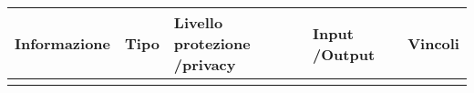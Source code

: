 \begin{center}

    \begin{tabularx}{\textwidth}
        {|X|>{\centering}X|X|X|X|}
        \hline  \rowcolor{tableGreen!70}
        \multicolumn{5}{|c|}{\Large\textbf{?}}
        \n      \rowcolor{tableGreen!50}
        \large \textbf{Informazione} & \large\textbf{Tipo} & \centering\large\textbf{Livello protezione /privacy} & \centering\large\textbf{Input /Output} & \centering\large\textbf{Vincoli}\tabularnewline
        \hline                       &                     &                                                      &                                        &
        \n
    \end{tabularx}
    \label{tab:monkeytable:problema:tabFlusso:?}
\end{center}









\begin{comment}
...
\end{comment}